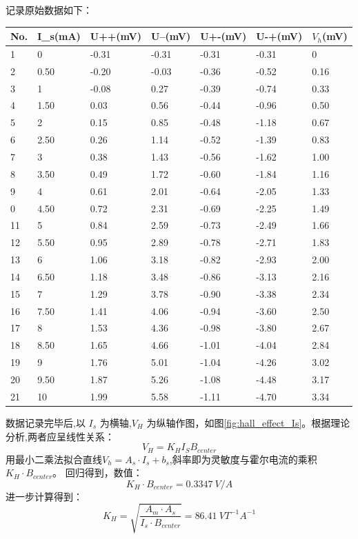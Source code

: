 \documentclass[UTF8]{ctexart}
\begin{document}
    记录原始数据如下：
    \begin{table}[htbp]
        \centering    
        \begin{tabular}{l|llllll}
        No.&I\_s(mA)&U++(mV)&U--(mV)&U+-(mV)&U-+(mV)&$V_h$(mV)\\
        \hline
        1&0&-0.31&-0.31&-0.31&-0.31&0\\
        2&0.50&-0.20&-0.03&-0.36&-0.52&0.16\\
        3&1&-0.08&0.27&-0.39&-0.74&0.33\\
        4&1.50&0.03&0.56&-0.44&-0.96&0.50\\
        5&2&0.15&0.85&-0.48&-1.18&0.67\\
        6&2.50&0.26&1.14&-0.52&-1.39&0.83\\
        7&3&0.38&1.43&-0.56&-1.62&1.00\\
        8&3.50&0.49&1.72&-0.60&-1.84&1.16\\
        9&4&0.61&2.01&-0.64&-2.05&1.33\\
        0&4.50&0.72&2.31&-0.69&-2.25&1.49\\
        11&5&0.84&2.59&-0.73&-2.49&1.66\\
        12&5.50&0.95&2.89&-0.78&-2.71&1.83\\
        13&6&1.06&3.18&-0.82&-2.93&2.00\\
        14&6.50&1.18&3.48&-0.86&-3.13&2.16\\
        15&7&1.29&3.78&-0.90&-3.38&2.34\\
        16&7.50&1.41&4.06&-0.94&-3.60&2.50\\
        17&8&1.53&4.36&-0.98&-3.80&2.67\\
        18&8.50&1.65&4.66&-1.01&-4.04&2.84\\
        19&9&1.76&5.01&-1.04&-4.26&3.02\\
        20&9.50&1.87&5.26&-1.08&-4.48&3.17\\
        21&10&1.99&5.58&-1.11&-4.70&3.34\\
        \end{tabular}
    \end{table}    
    数据记录完毕后,以 $I_s$ 为横轴,$V_H$ 为纵轴作图，如图\ref{fig:hall_effect_Is}。根据理论分析,两者应呈线性关系：
    \begin{equation}
    V_H = K_H I_S B_{center}
    \end{equation}
    用最小二乘法拟合直线$V_h = A_s \cdot I_s + b_s$,斜率即为灵敏度与霍尔电流的乘积 $K_H \cdot B_{center}$。
    回归得到，数值：
    \begin{equation}
        K_H \cdot B_{center} = \SI{0.3347}{V/A}
    \end{equation}
    进一步计算得到：
    \begin{equation}
        K_H = \sqrt{\frac{A_m \cdot A_s}{I_s \cdot B_{center}}} = \SI{86.41}{VT^{-1}A^{-1}}
    \end{equation}
\end{document}

